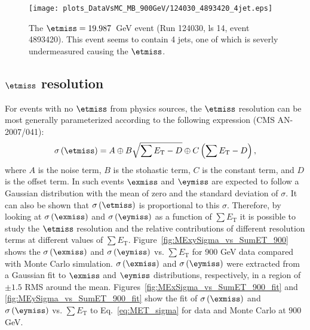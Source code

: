 \begin{figure}[h!]
  \texttt{[image: plots\_DataVsMC\_MB\_900GeV/124030\_4893420\_4jet.eps]}
  \caption{The $\etmiss=19.987$~GeV event (Run 124030, ls
    14, event 4893420). This event seems to contain 4 jets, one of which
    is severly undermeasured causing the $\etmiss$.
    \label{fig:DataVsMC_MB_900_evd3}}
\end{figure}


\clearpage

\subsection{$\etmiss$ resolution}

For events with no $\etmiss$ from physics sources, the $\etmiss$ resolution can be most generally parameterized
according to the following expression (CMS AN-2007/041):
\begin{equation}
  \sigma\left(\etmiss\right)=A \oplus B\sqrt{\sum E_\text{T}-D} \oplus C\left(\sum E_\text{T}-D\right),
  \label{eq:MET_sigma}
\end{equation}
where $A$ is the noise term, $B$ is the stohastic term, $C$ is the constant term, and $D$ is the offset term. In such events
$\exmiss$ and $\eymiss$ are expected to follow a Gaussian distribution with the mean of zero and the standard deviation
of $\sigma$. It can also be shown that $\sigma\left(\etmiss\right)$ is proportional to this $\sigma$. Therefore,
by looking at $\sigma\left(\exmiss\right)$ and $\sigma\left(\eymiss\right)$ as a function of $\sum E_\text{T}$ it is possible to
study the $\etmiss$ resolution and the relative contributions of different resolution terms at different values of $\sum E_\text{T}$.
Figure~\ref{fig:MExySigma_vs_SumET_900} shows the $\sigma\left(\exmiss\right)$ and $\sigma\left(\eymiss\right)$ 
vs. $\sum E_\text{T}$ for 900 GeV data compared with Monte Carlo simulation. $\sigma\left(\exmiss\right)$ and $\sigma\left(\eymiss\right)$
were extracted from a Gaussian fit to $\exmiss$ and $\eymiss$ distributions, respectively, in a region of $\pm 1.5$ RMS around the mean.
Figures~\ref{fig:MExSigma_vs_SumET_900_fit} and \ref{fig:MEySigma_vs_SumET_900_fit} show the fit of $\sigma\left(\exmiss\right)$
 and $\sigma\left(\eymiss\right)$ vs. $\sum E_\text{T}$ to Eq.~\ref{eq:MET_sigma} for data and Monte Carlo at $900$ GeV.

